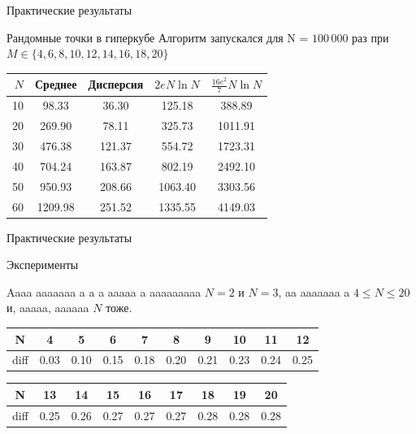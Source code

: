 \documentclass{beamer}
\begin{document}
\begin{frame}{Практические результаты}
\begin{block}{Рандомные точки в гиперкубе}
Алгоритм запускался для N = $100\,000$ раз при $M \in \{4, 6, 8, 10, 12, 14, 16, 18, 20\}$
\begin{table}[h]
\begin{center}
\begin{tabular}{r|c|c|c|c}
$N$ & Среднее & Дисперсия & $2eN \ln N$ & $\frac{16e^2}{7}N \ln N$ \\\hline
10 & 98.33 & 36.30 & 125.18 & 388.89 \\
20 & 269.90 & 78.11 & 325.73 & 1011.91 \\
30 & 476.38 & 121.37 & 554.72 & 1723.31 \\
40 & 704.24 & 163.87 & 802.19 & 2492.10 \\
50 & 950.93 & 208.66 & 1063.40 & 3303.56 \\
60 & 1209.98 & 251.52 & 1335.55 & 4149.03
\end{tabular}
\end{center}
\end{table}
\end{block}
\end{frame}

\begin{frame}{Практические результаты}
\begin{block}{Эксперименты}

Aaaa aaaaaaa a a a aaaaa a aaaaaaaaa $N = 2$ и $N = 3$, aa aaaaaaa a $4 \leq N \leq 20$ и, aaaaa, aaaaaa $N$ тоже.

\begin{table}
\begin{center}
\begin{tabular}{|c|c|c|c|c|c|c|c|c|c|} \hline
N    & 4    & 5    & 6    & 7    & 8    & 9    & 10   & 11   & 12   \\\hline
diff & 0.03 & 0.10 & 0.15 & 0.18 & 0.20 & 0.21 & 0.23 & 0.24 & 0.25 \\\hline
\end{tabular}
\end{center}
\end{table}
\begin{table}
\begin{center}
\begin{tabular}{|c|c|c|c|c|c|c|c|c|} \hline
N    & 13   & 14   & 15   & 16   & 17   & 18   & 19   & 20   \\\hline
diff & 0.25 & 0.26 & 0.27 & 0.27 & 0.27 & 0.28 & 0.28 & 0.28 \\\hline
\end{tabular}
\end{center}
\end{table}
\end{block}
\end{frame}
\end{document}
